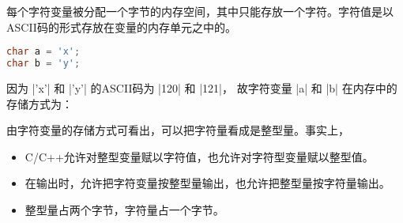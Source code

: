 \begin{frame}[fragile]

每个字符变量被分配一个字节的内存空间，其中只能存放一个字符。字符值是以ASCII码的形式存放在变量的内存单元之中的。


\pause 
\begin{lstlisting}[language=C]
char a = 'x';    
char b = 'y'; 
\end{lstlisting}
因为 \lst|'x'| 和 \lst|'y'| 的ASCII码为 \lst|120| 和 \lst|121|，
故字符变量 \lst|a| 和 \lst|b| 在内存中的存储方式为：
\begin{figure}
\centering
{}
\end{figure}
\end{frame}

\begin{frame}[fragile]
由字符变量的存储方式可看出，可以把字符量看成是整型量。事实上，\vspace{0.05in}

\begin{itemize}
\item 
C/C++允许对整型变量赋以字符值，也允许对字符型变量赋以整型值。\\[0.1in]
\item 
在输出时，允许把字符变量按整型量输出，也允许把整型量按字符量输出。
\\[0.1in]
\item 
整型量占两个字节，字符量占一个字节。
\end{itemize}
\end{frame}

